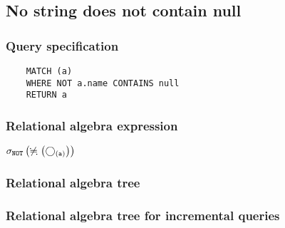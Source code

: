 	\subsection{No string does not contain null}

	\subsubsection*{Query specification}

	\begin{lstlisting}
	MATCH (a)
	WHERE NOT a.name CONTAINS null
	RETURN a
	\end{lstlisting}


	\subsubsection*{Relational algebra expression}

	$\selection{\mathtt{NOT}} \left(\alldifferent{} \left(\getvertices{a}{}\right)\right)$

	\subsubsection*{Relational algebra tree}


	\subsubsection*{Relational algebra tree for incremental queries}

